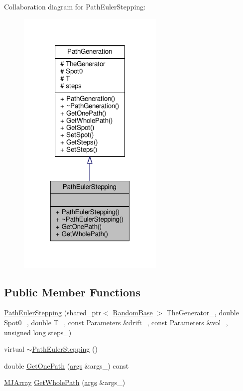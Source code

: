 Collaboration diagram for Path\+Euler\+Stepping\+:
\nopagebreak
\begin{figure}[H]
\begin{center}
\leavevmode
\includegraphics[width=199pt]{classPathEulerStepping__coll__graph}
\end{center}
\end{figure}
\subsection*{Public Member Functions}
\begin{DoxyCompactItemize}
\item 
\hyperlink{classPathEulerStepping_ae05c03118547af2589fbad9566497140}{Path\+Euler\+Stepping} (shared\+\_\+ptr$<$ \hyperlink{classRandomBase}{Random\+Base} $>$ The\+Generator\+\_\+, double Spot0\+\_\+, double T\+\_\+, const \hyperlink{classParameters}{Parameters} \&drift\+\_\+, const \hyperlink{classParameters}{Parameters} \&vol\+\_\+, unsigned long steps\+\_\+)
\item 
virtual \hyperlink{classPathEulerStepping_a057260b4f22fdd8a9816047e1552960e}{$\sim$\+Path\+Euler\+Stepping} ()
\item 
double \hyperlink{classPathEulerStepping_a7e38aa13e5807f3010892f7a4772fac6}{Get\+One\+Path} (\hyperlink{path__generation_8h_a75c13cde2074f502cc4348c70528572d}{args} \&args\+\_\+) const
\item 
\hyperlink{classMJArray}{M\+J\+Array} \hyperlink{classPathEulerStepping_afb4f8e7ce3c81671111486c0fa92a9d2}{Get\+Whole\+Path} (\hyperlink{path__generation_8h_a75c13cde2074f502cc4348c70528572d}{args} \&args\+\_\+)
\end{DoxyCompactItemize}
